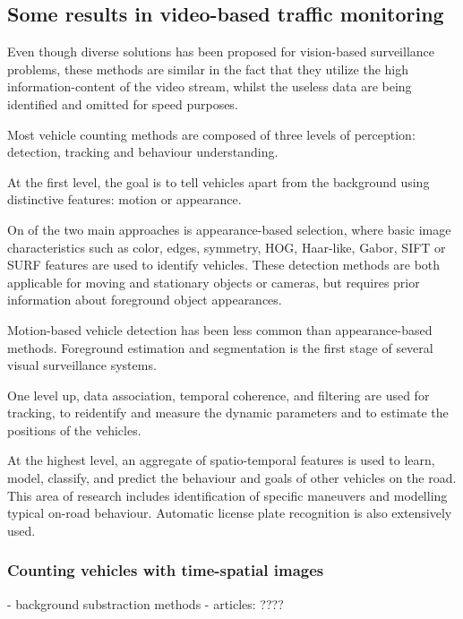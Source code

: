 \subsection{Some results in video-based traffic monitoring}
Even though diverse solutions has been proposed for vision-based surveillance problems, these methods are similar in the fact that they utilize the high information-content of the video stream, whilst the useless data are being identified and omitted for speed purposes.

Most vehicle counting methods are composed of three levels of perception: detection, tracking and behaviour understanding.

At the first level, the goal is to tell vehicles apart from the background using distinctive features: motion or appearance.

On of the two main approaches is appearance-based selection, where basic image characteristics such as color\cite{Chang2005}, edges\cite{Blanc2007}, symmetry\cite{Aytekin2010}, HOG\cite{TehraniNiknejad2012}, Haar-like\cite{Sivaraman2012}, Gabor\cite{Zhang2006}, SIFT\cite{Zhang2011} or SURF\cite{Lin2012} features are used to identify vehicles.
These detection methods are both applicable for moving and stationary objects or cameras, but requires prior information about foreground object appearances.

Motion-based vehicle detection has been less common than appearance-based methods.
Foreground estimation and segmentation is the first stage of
several visual surveillance systems.

One level up, data association, temporal coherence, and filtering are used for tracking, to reidentify and measure the dynamic parameters and to estimate the positions of the vehicles. 

At the highest level, an aggregate of spatio-temporal features is used to learn, model, classify, and predict the behaviour and goals of other vehicles on the road. 
This area of research includes identification of specific maneuvers and modelling typical on-road behaviour.
Automatic license plate recognition is also extensively used\cite{Luvizon2016, Sivaraman2013}. 



\subsubsection{Counting vehicles with time-spatial images}
- background substraction methods
- articles: ????

